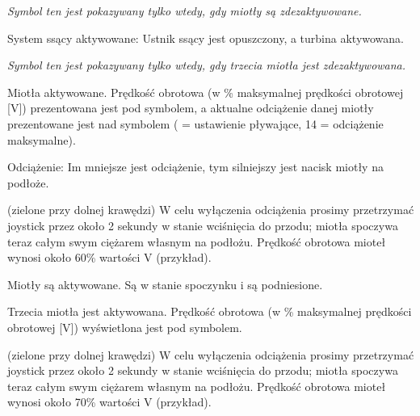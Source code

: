 
{\em Symbol ten jest pokazywany tylko wtedy, gdy miotły są zdezaktywowane.}

\startSymVpad
{}
\SymVpad
{} System ssący aktywowane:
Ustnik ssący jest opuszczony, a turbina aktywowana.
\stopSymVpad



{\em Symbol ten jest pokazywany tylko wtedy, gdy trzecia miotła jest zdezaktywowana.}

\startSymVpad
{}
\SymVpad
{} Miotła aktywowane. Prędkość obrotowa (w \% maksymalnej prędkości obrotowej [V]) prezentowana jest pod symbolem, a aktualne odciążenie danej miotły prezentowane jest nad symbolem (\type{ } = ustawienie pływające, 14 = odciążenie maksymalne).

{\md Odciążenie:} {\lt Im mniejsze jest odciążenie, tym silniejszy jest nacisk miotły na podłoże.}
\stopSymVpad


\startSymVpad
{}
\SymVpad
{}(zielone przy dolnej krawędzi)
W celu wyłączenia odciążenia prosimy przetrzymać joystick przez około 2 sekundy w stanie wciśnięcia do przodu; miotła spoczywa teraz całym swym ciężarem własnym na podłożu. Prędkość obrotowa mioteł wynosi około 60\hairspace\% wartości V (przykład).
\stopSymVpad

\startSymVpad
{}
\SymVpad
{} Miotły są aktywowane. Są w stanie spoczynku i są podniesione.
\stopSymVpad



\startSymVpad
{}
\SymVpad
{} Trzecia miotła jest aktywowana. Prędkość obrotowa (w \% maksymalnej prędkości obrotowej [V]) wyświetlona jest pod symbolem.
\stopSymVpad


\startSymVpad
{}
\SymVpad
{}(zielone przy dolnej krawędzi)
W celu wyłączenia odciążenia prosimy przetrzymać joystick przez około 2 sekundy w stanie wciśnięcia do przodu; miotła spoczywa teraz całym swym ciężarem własnym na podłożu. Prędkość obrotowa mioteł wynosi około 70\hairspace\% wartości V (przykład).

